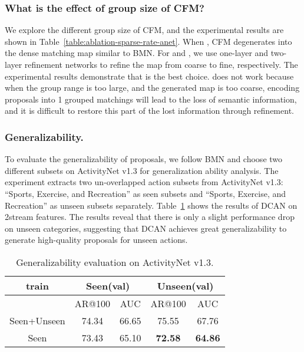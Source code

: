 \documentclass[letterpaper]{article} \usepackage{aaai22}  \usepackage{times}  \usepackage{helvet}  \usepackage{courier}  \usepackage[hyphens]{url}  \usepackage{graphicx} \urlstyle{rm} \def\UrlFont{\rm}  \usepackage{natbib}  \usepackage{caption} \DeclareCaptionStyle{ruled}{labelfont=normalfont,labelsep=colon,strut=off} \frenchspacing  \setlength{\pdfpagewidth}{8.5in}  \setlength{\pdfpageheight}{11in}  \usepackage{algorithm}
\begin{document}
\subsubsection{What is the effect of group size  of CFM?}
We explore the different group size  of CFM, and the experimental results are shown in Table~\ref{table:ablation-sparse-rate-anet}.
When , CFM degenerates into the dense matching map similar to BMN.
For  and , we use one-layer and two-layer refinement networks to refine the map from coarse to fine, respectively.
The experimental results demonstrate that  is the best choice.
 does not work because when the group range is too large, and the generated map is too coarse, encoding  proposals into 1 grouped matchings will lead to the loss of semantic information, and it is difficult to restore this part of the lost information through refinement.



\subsubsection{Generalizability.}


To evaluate the generalizability of proposals, we follow BMN and choose two different subsets on ActivityNet v1.3 for generalization ability analysis. The experiment extracts two un-overlapped action subsets from ActivityNet v1.3: ``Sports, Exercise, and Recreation'' as seen subsets and ``Sports, Exercise, and Recreation'' as unseen subsets separately. Table~\ref{gen} shows the results of DCAN on 2stream features. The results reveal that there is only a slight performance drop on unseen categories, suggesting that DCAN achieves great generalizability to generate high-quality proposals for unseen actions. 


\begin{table}[h]
\centering
\caption{Generalizability evaluation on ActivityNet v1.3.}
\label{gen}
\begin{tabular}{ccccc}

\hline
      train            & \multicolumn{2}{c}{Seen(val)} & \multicolumn{2}{c}{Unseen(val)} \\
                  \hline
                  & AR@100         & AUC          & AR@100          & AUC           \\
                  \hline
Seen+Unseen & 74.34          & 66.65        & 75.55           & 67.76        \\
Seen        & 73.43          & 65.10        & \textbf{72.58}           &\textbf{64.86} \\       \hline
\end{tabular}
\end{table}
\end{document}
